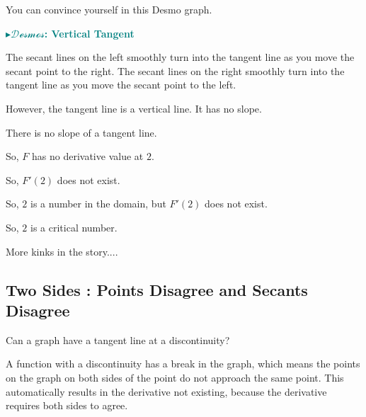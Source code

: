 \documentclass{ximera}
\begin{document}
You can convince yourself in this Desmo graph. 





\begin{onlineOnly}
\textbf{\textcolor{teal}{$\blacktriangleright \mathcal{Desmos}$: Vertical Tangent}} 
\begin{center}
\end{center}
\end{onlineOnly}







The secant lines on the left smoothly turn into the tangent line as you move the secant point to the right. The secant lines on the right smoothly turn into the tangent line as you move the secant point to the left. 



However, the tangent line is a vertical line.  It has no slope.


There is no slope of a tangent line. 

So, $F$ has no derivative value at $2$.  

So, $F'(2)$ does not exist. 

So, $2$ is a number in the domain, but $F'(2)$ does not exist. 

So, $2$ is a critical number.

























More kinks in the story....

\subsection*{Two Sides : Points Disagree and Secants Disagree}





Can a graph have a tangent line at a discontinuity?

A function with a discontinuity has a break in the graph, which means the points on the graph on both sides of the point do not approach the same point.  This automatically results in the derivative not existing, because the derivative requires both sides to agree.
\end{document}
